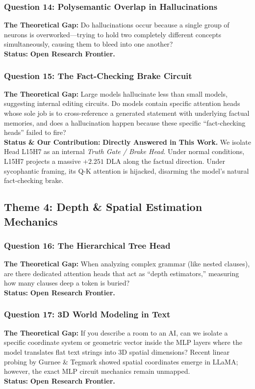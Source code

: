 \documentclass[11pt,a4paper]{article}
\begin{document}
\subsubsection{Question 14: Polysemantic Overlap in Hallucinations}
\textbf{The Theoretical Gap:} Do hallucinations occur because a single group of neurons is overworked---trying to hold two completely different concepts simultaneously, causing them to bleed into one another? \\
\textbf{Status:} \textbf{Open Research Frontier.}

\subsubsection{Question 15: The Fact-Checking Brake Circuit}
\textbf{The Theoretical Gap:} Large models hallucinate less than small models, suggesting internal editing circuits. Do models contain specific attention heads whose sole job is to cross-reference a generated statement with underlying factual memories, and does a hallucination happen because these specific ``fact-checking heads'' failed to fire? \\
\textbf{Status \& Our Contribution:} \textbf{Directly Answered in This Work.} We isolate Head L15H7 as an internal \textit{Truth Gate / Brake Head}. Under normal conditions, L15H7 projects a massive $+2.251$ DLA along the factual direction. Under sycophantic framing, its Q-K attention is hijacked, disarming the model's natural fact-checking brake.

\subsection{Theme 4: Depth \& Spatial Estimation Mechanics}

\subsubsection{Question 16: The Hierarchical Tree Head}
\textbf{The Theoretical Gap:} When analyzing complex grammar (like nested clauses), are there dedicated attention heads that act as ``depth estimators,'' measuring how many clauses deep a token is buried? \\
\textbf{Status:} \textbf{Open Research Frontier.}

\subsubsection{Question 17: 3D World Modeling in Text}
\textbf{The Theoretical Gap:} If you describe a room to an AI, can we isolate a specific coordinate system or geometric vector inside the MLP layers where the model translates flat text strings into 3D spatial dimensions? Recent linear probing by Gurnee \& Tegmark \cite{gurnee2023language} showed spatial coordinates emerge in LLaMA; however, the exact MLP circuit mechanics remain unmapped. \\
\textbf{Status:} \textbf{Open Research Frontier.}
\end{document}
